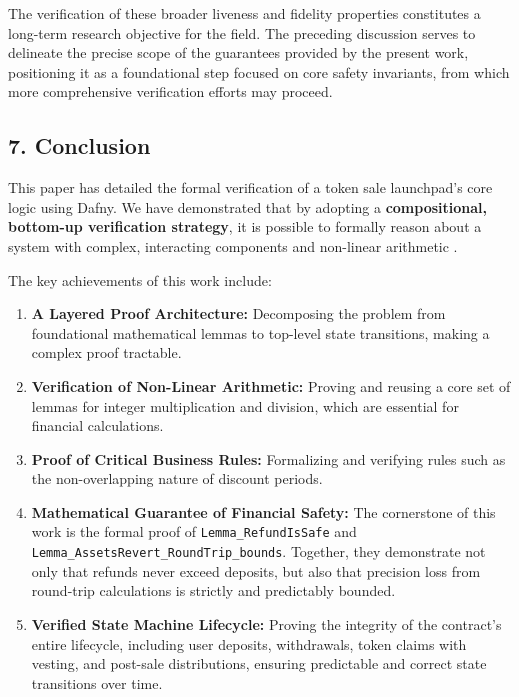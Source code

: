 \documentclass[
  english,
  onecolumn]{article}
\providecommand{\tightlist}{%
  \setlength{\itemsep}{0pt}\setlength{\parskip}{0pt}}
\begin{document}
The verification of these broader liveness and fidelity properties
constitutes a long-term research objective for the field. The preceding
discussion serves to delineate the precise scope of the guarantees
provided by the present work, positioning it as a foundational step
focused on core safety invariants, from which more comprehensive
verification efforts may proceed.

\subsection{7. Conclusion}\label{conclusion}

This paper has detailed the formal verification of a token sale
launchpad's core logic using Dafny. We have demonstrated that by
adopting a \textbf{compositional, bottom-up verification strategy}, it
is possible to formally reason about a system with complex, interacting
components and non-linear arithmetic
.

The key achievements of this work include:

\begin{enumerate}
\def\labelenumi{\arabic{enumi}.}
\tightlist
\item
  \textbf{A Layered Proof Architecture:} Decomposing the problem from
  foundational mathematical lemmas to top-level state transitions,
  making a complex proof tractable.
\item
  \textbf{Verification of Non-Linear Arithmetic:} Proving and reusing a
  core set of lemmas for integer multiplication and division, which are
  essential for financial calculations.
\item
  \textbf{Proof of Critical Business Rules:} Formalizing and verifying
  rules such as the non-overlapping nature of discount periods.
\item
  \textbf{Mathematical Guarantee of Financial Safety:} The cornerstone
  of this work is the formal proof of \texttt{Lemma\_RefundIsSafe} and
  \texttt{Lemma\_AssetsRevert\_RoundTrip\_bounds}. Together, they
  demonstrate not only that refunds never exceed deposits, but also that
  precision loss from round-trip calculations is strictly and
  predictably bounded.
\item
  \textbf{Verified State Machine Lifecycle:} Proving the integrity of
  the contract's entire lifecycle, including user deposits, withdrawals,
  token claims with vesting, and post-sale distributions, ensuring
  predictable and correct state transitions over time.
\end{enumerate}
\end{document}
